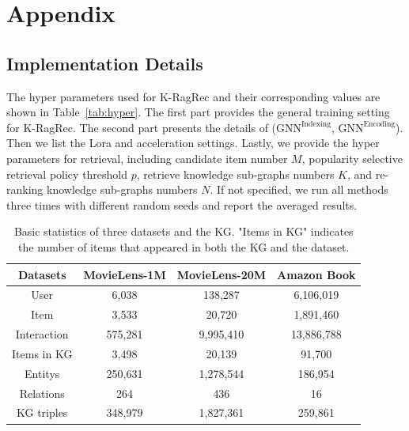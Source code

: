 \newpage

\section{Appendix}



\subsection{Implementation Details}\label{appendix:hyper}
The hyper parameters used for K-RagRec and their corresponding values are shown in Table~\ref{tab:hyper}. The first part provides the general training setting for K-RagRec. The second part presents the details of ($\text{GNN}^{\text{Indexing}}$, $\text{GNN}^{\text{Encoding}}$). Then we list the Lora and acceleration settings. Lastly, we provide the hyper parameters for retrieval, including candidate item number $M$, popularity selective retrieval policy threshold $p$, retrieve knowledge sub-graphs numbers $K$, and re-ranking knowledge sub-graphs numbers $N$. If not specified, we run all methods three times with different random seeds and report the averaged results.


\begin{table}[htbp]
 \vskip -0.02in
  \centering
  \caption{Basic statistics of three datasets and the KG. "Items in KG" indicates the number of items that appeared in both the KG and the dataset. 
  }
   \vskip -0.1in
    \scalebox{0.6}
{
  \begin{adjustbox}{}
    \begin{tabular}{c|c|c|c}
    \toprule
    \toprule
    \multirow{1}{*}{Datasets} & {MovieLens-1M} & {MovieLens-20M} & {Amazon Book} \\
    \midrule
User  & 6,038 & 138,287 & 6,106,019 \\
Item & 3,533 & 20,720 & 1,891,460 \\
Interaction & 575,281 & 9,995,410 & 13,886,788 \\
Items in KG & 3,498 & 20,139 & 91,700 \\
\midrule
Entitys & 250,631 & 1,278,544 & 186,954\\
Relations &  264   & 436    & 16 \\
KG triples & 348,979 & 1,827,361 & 259,861  \\
    \bottomrule
    \bottomrule
    \end{tabular}%
    \end{adjustbox}
}
 \vskip -0.1in
  \label{tab:datasets}%
\end{table}%

